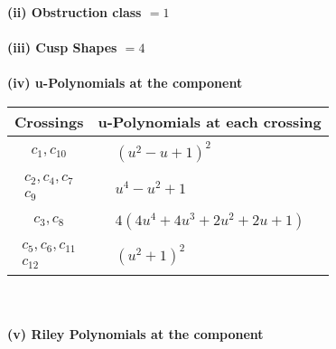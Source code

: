 \documentclass[1p]{elsarticle_modified}
\theoremstyle{definition}
\begin{document}
\flushleft \textbf{(ii) Obstruction class $= 1$}\\~\\
\flushleft \textbf{(iii) Cusp Shapes $= 4$}\\~\\
\newpage\renewcommand{\arraystretch}{1}
\flushleft \textbf{(iv) u-Polynomials at the component}\newline \\
\begin{tabular}{m{50pt}|m{274pt}}
Crossings & \hspace{64pt}u-Polynomials at each crossing \\
\hline $$\begin{aligned}c_{1},c_{10}\end{aligned}$$&$\begin{aligned}
&(u^2- u+1)^2
\end{aligned}$\\
\hline $$\begin{aligned}c_{2},c_{4},c_{7}\\c_{9}\end{aligned}$$&$\begin{aligned}
&u^4- u^2+1
\end{aligned}$\\
\hline $$\begin{aligned}c_{3},c_{8}\end{aligned}$$&$\begin{aligned}
&4(4 u^4+4 u^3+2 u^2+2 u+1)
\end{aligned}$\\
\hline $$\begin{aligned}c_{5},c_{6},c_{11}\\c_{12}\end{aligned}$$&$\begin{aligned}
&(u^2+1)^2
\end{aligned}$\\
\hline
\end{tabular}\\~\\
\newpage\renewcommand{\arraystretch}{1}
\flushleft \textbf{(v) Riley Polynomials at the component}\newline \\
\end{document}

